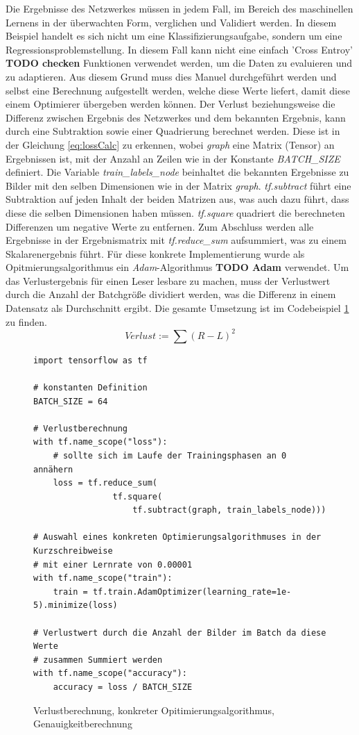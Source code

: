 Die Ergebnisse des Netzwerkes müssen in jedem Fall, im Bereich des maschinellen Lernens in der überwachten Form, verglichen und Validiert werden. 
In diesem Beispiel handelt es sich nicht um eine Klassifizierungsaufgabe, sondern um eine Regressionsproblemstellung. 
In diesem Fall kann nicht eine einfach 'Cross Entroy' \textbf{TODO checken} Funktionen verwendet werden, um die Daten zu evaluieren und zu adaptieren. 
Aus diesem Grund muss dies Manuel durchgeführt werden und selbst eine Berechnung aufgestellt werden, welche diese Werte liefert, damit diese einem Optimierer übergeben werden können. 
Der Verlust beziehungsweise die Differenz zwischen Ergebnis des Netzwerkes und dem bekannten Ergebnis, kann durch eine Subtraktion sowie einer Quadrierung berechnet werden. 
Diese ist in der Gleichung \ref{eq:lossCalc} zu erkennen, wobei \textit{graph} eine Matrix (Tensor) an Ergebnissen ist, mit der Anzahl an Zeilen wie in der Konstante \textit{BATCH\_SIZE} definiert. 
Die Variable \textit{train\_labels\_node} beinhaltet die bekannten Ergebnisse zu Bilder mit den selben Dimensionen wie in der Matrix \textit{graph}. 
\textit{tf.subtract} führt eine Subtraktion auf jeden Inhalt der beiden Matrizen aus, was auch dazu führt, dass diese die selben Dimensionen haben müssen. 
\textit{tf.square} quadriert die berechneten Differenzen um negative Werte zu entfernen. 
Zum Abschluss werden alle Ergebnisse in der Ergebnismatrix mit \textit{tf.reduce\_sum} aufsummiert, was zu einem Skalarenergebnis führt. 
Für diese konkrete Implementierung wurde als Opitmierungsalgorithmus ein \textit{Adam}-Algorithmus \textbf{TODO Adam} verwendet. 
Um das Verlustergebnis für einen Leser lesbare zu machen, muss der Verlustwert durch die Anzahl der Batchgröße dividiert werden, was die Differenz in einem Datensatz als Durchschnitt ergibt. 
Die gesamte Umsetzung ist im Codebeispiel \ref{fig:VerlustKonkreOpitimier} zu finden. 
\begin{equation}
	Verlust := \sum{(R - L)^2}
	\label{eq:lossCalc}
\end{equation}
\begin{figure}[ht!]
\lstset{language=Python}
\begin{lstlisting}
import tensorflow as tf

# konstanten Definition
BATCH_SIZE = 64

# Verlustberechnung
with tf.name_scope("loss"):
    # sollte sich im Laufe der Trainingsphasen an 0 annähern
    loss = tf.reduce_sum(
    			tf.square(
    				tf.subtract(graph, train_labels_node)))

# Auswahl eines konkreten Optimierungsalgorithmuses in der Kurzschreibweise
# mit einer Lernrate von 0.00001
with tf.name_scope("train"):
    train = tf.train.AdamOptimizer(learning_rate=1e-5).minimize(loss)
    
# Verlustwert durch die Anzahl der Bilder im Batch da diese Werte 
# zusammen Summiert werden
with tf.name_scope("accuracy"):    
    accuracy = loss / BATCH_SIZE
\end{lstlisting}
	\caption{Verlustberechnung, konkreter Opitimierungsalgorithmus, Genauigkeitberechnung}
	\label{fig:VerlustKonkreOpitimier}
\end{figure}
 
